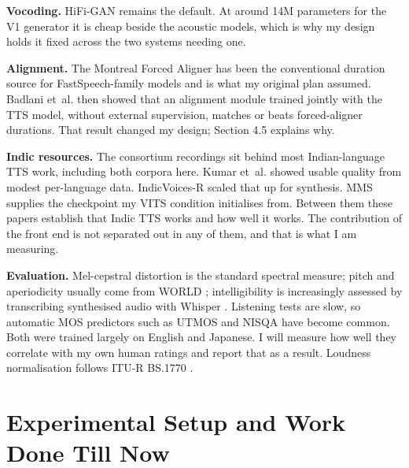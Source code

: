 \documentclass[12pt,a4paper]{article}
\begin{document}
\textbf{Vocoding.} HiFi-GAN \cite{kong2020hifigan} remains the default. At
around 14M parameters for the V1 generator it is cheap beside the acoustic
models, which is why my design holds it fixed across the two systems needing
one.

\textbf{Alignment.} The Montreal Forced Aligner \cite{mcauliffe2017mfa} has
been the conventional duration source for FastSpeech-family models and is what
my original plan assumed. Badlani et~al. \cite{badlani2022alignment} then
showed that an alignment module trained jointly with the TTS model, without
external supervision, matches or beats forced-aligner durations. That result
changed my design; Section 4.5 explains why.

\textbf{Indic resources.} The consortium recordings \cite{baby2016resources}
sit behind most Indian-language TTS work, including both corpora here. Kumar
et~al. \cite{kumar2023nextbillion} showed usable quality from modest
per-language data. IndicVoices-R \cite{sankar2024indicvoicesr} scaled that up
for synthesis. MMS \cite{pratap2024mms} supplies the checkpoint my VITS
condition initialises from. Between them these papers establish that Indic TTS works and
how well it works. The contribution of the front end is not separated out in
any of them, and that is what I am measuring.

\textbf{Evaluation.} Mel-cepstral distortion \cite{kubichek1993mcd} is the
standard spectral measure; pitch and aperiodicity usually come from WORLD
\cite{morise2016world}; intelligibility is increasingly assessed by
transcribing synthesised audio with Whisper \cite{radford2023whisper}. Listening
tests are slow, so automatic MOS predictors such as UTMOS
\cite{saeki2022utmos} and NISQA \cite{mittag2021nisqa} have become common.
Both were trained largely on English and Japanese. I will measure how well they
correlate with my own human ratings and report that as a result. Loudness
normalisation follows ITU-R BS.1770 \cite{itu2015bs1770}.

\section{Experimental Setup and Work Done Till Now}
\end{document}
